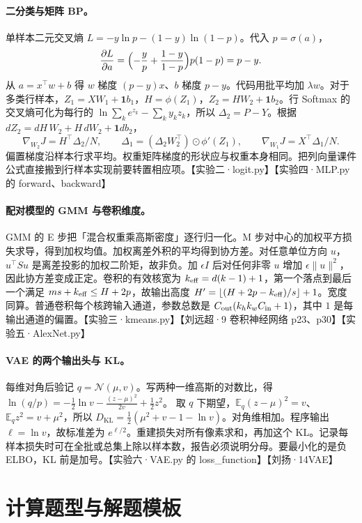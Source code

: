 \documentclass[UTF8,a4paper,zihao=-4,fontset=fandol]{ctexrep}
\begin{document}
\paragraph{二分类与矩阵 BP。}
单样本二元交叉熵 $L=-y\ln p-(1-y)\ln(1-p)$。代入 $p=\sigma(a)$，
\[
\frac{\partial L}{\partial a}
=\Bigl(-\frac{y}{p}+\frac{1-y}{1-p}\Bigr)p(1-p)=p-y .
\]
从 $a=x^\top w+b$ 得 $w$ 梯度 $(p-y)x$、$b$ 梯度 $p-y$。代码用批平均加 $\lambda w$。对于多类行样本，$Z_1=XW_1+\mathbf1b_1$，$H=\phi(Z_1)$，$Z_2=HW_2+\mathbf1 b_2$。行 Softmax 的交叉熵可化为每行的 $\ln\sum_k e^{z_k}-\sum_ky_kz_k$，所以 $\Delta_2=P-Y$。根据 $dZ_2=dH\,W_2+H\,dW_2+\mathbf1db_2$，
\[
\nabla_{W_2}J=H^\top\Delta_2/N,\qquad
\Delta_1=(\Delta_2W_2^\top)\odot\phi'(Z_1),\qquad
\nabla_{W_1}J=X^\top\Delta_1/N .
\]
偏置梯度沿样本行求平均。权重矩阵梯度的形状应与权重本身相同。把列向量课件公式直接搬到行样本实现前要转置相应项。【实验二·logit.py】【实验四·MLP.py 的 forward、backward】

\paragraph{配对模型的 GMM 与卷积维度。}
GMM 的 E 步把「混合权重乘高斯密度」逐行归一化。M 步对中心的加权平方损失求导，得到加权均值。加权离差外积的平均得到协方差。对任意单位方向 $u$，$u^\top S u$ 是离差投影的加权二阶矩，故非负。加 $\epsilon I$ 后对任何非零 $u$ 增加 $\epsilon\|u\|^2$，因此协方差变成正定。卷积的有效核宽为 $k_{\rm eff}=d(k-1)+1$，第一个落点到最后一个满足 $ms+k_{\rm eff}\le H+2p$，故输出高度 $H'=\lfloor(H+2p-k_{\rm eff})/s\rfloor+1$。宽度同算。普通卷积每个核跨输入通道，参数总数是 $C_{\rm out}(k_hk_wC_{\rm in}+1)$，其中 $1$ 是每输出通道的偏置。【实验三·kmeans.py】【刘远超·9 卷积神经网络 p23、p30】【实验五·AlexNet.py】

\paragraph{VAE 的两个输出头与 KL。}
每维对角后验记 $q=\mathcal N(\mu,v)$。写两种一维高斯的对数比，得
$\ln(q/p)=-\frac12\ln v-\frac{(z-\mu)^2}{2v}+\frac12 z^2$。
取 $q$ 下期望，$\mathbb E_q(z-\mu)^2=v$、$\mathbb E_q z^2=v+\mu^2$，所以
$D_{\mathrm{KL}}=\frac12(\mu^2+v-1-\ln v)$。对角维相加。程序输出 $\ell=\ln v$，故标准差为 $e^{\ell/2}$。重建损失对所有像素求和，再加这个 KL。记录每样本损失时可在全批或总集上除以样本数，报告必须说明分母。要最小化的是负 ELBO，KL 前是加号。【实验六·VAE.py 的 loss\_function】【刘扬·14VAE】

\section{计算题型与解题模板}
\end{document}
